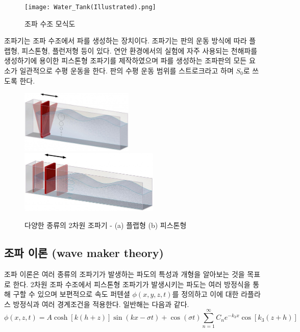 \begin{figure}[htbp]
\begin{center}
\texttt{[image: Water\_Tank(Illustrated).png]}
\end{center}
\caption{조파 수조 모식도}
\label{Fig01}
\end{figure}
조파기는 조파 수조에서 파를 생성하는 장치이다. 조파기는 판의 운동 방식에 따라 플랩형, 피스톤형, 플런저형 등이 있다. 연안 환경에서의 실험에 자주 사용되는 천해파를 생성하기에 용이한 피스톤형 조파기를 제작하였으며 파를 생성하는 조파판의 모든 요소가 일관적으로 수평 운동을 한다. 판의 수평 운동 범위를 스트로크라고 하며 $S_0$로 쓰도록 한다.
\begin{figure}[H]
    \begin{center}
        \includegraphics[height=3cm]{images/Wave_Maker(Flap).jpg}
        \includegraphics[height=3cm]{images/Wave_Maker(Piston).jpg}
    \end{center}
        \caption{다양한 종류의 2차원 조파기 - (a) 플랩형 (b) 피스톤형}
        \label{Experimnet_System} 
\end{figure}

\subsection{조파 이론 (wave maker theory)}

조파 이론은 여러 종류의 조파기가 발생하는 파도의 특성과 개형을 알아보는 것을 목표로 한다\cite{zhang2007deterministic,ojk2018}.
2차원 조파 수조에서 피스톤형 조파기가 발생시키는 파도는 여러 방정식을 통해 구할 수 있으며 보편적으로 속도 퍼텐셜 $\phi(x, y, z, t)$를 정의하고 이에 대한 라플라스 방정식과 여러 경계조건을 적용한다. 일반해는 다음과 같다.
\begin{equation} \label{eq:1}
{
\phi(x, z, t) = A\cosh{[k(h+z)]}\sin(kx-\sigma t) +
\cos(\sigma t){\sum_{n=1}^{\infty}} C_n e^{-k_3 x} \cos{[k_3 (z+h)]} 
}
\end{equation}


